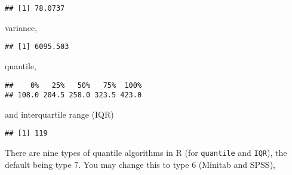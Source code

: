 \documentclass[]{book}
\newenvironment{Shaded}{\begin{snugshade}}{\end{snugshade}}
\newcommand{\KeywordTok}[1]{\textcolor[rgb]{0.13,0.29,0.53}{\textbf{{#1}}}}
\newcommand{\DataTypeTok}[1]{\textcolor[rgb]{0.13,0.29,0.53}{{#1}}}
\newcommand{\DecValTok}[1]{\textcolor[rgb]{0.00,0.00,0.81}{{#1}}}
\newcommand{\NormalTok}[1]{{#1}}
\theoremstyle{definition}
\theoremstyle{definition}
\theoremstyle{remark}
\begin{document}
\begin{Shaded}
\end{Shaded}

\begin{verbatim}
## [1] 78.0737
\end{verbatim}

variance,

\begin{Shaded}
\end{Shaded}

\begin{verbatim}
## [1] 6095.503
\end{verbatim}

quantile,

\begin{Shaded}
\end{Shaded}

\begin{verbatim}
##    0%   25%   50%   75%  100% 
## 108.0 204.5 258.0 323.5 423.0
\end{verbatim}

and interquartile range (IQR)

\begin{Shaded}
\end{Shaded}

\begin{verbatim}
## [1] 119
\end{verbatim}

There are nine types of quantile algorithms in R (for \texttt{quantile}
and \texttt{IQR}), the default being type 7. You may change this to type
6 (Minitab and SPSS),

\begin{Shaded}
\end{Shaded}
\end{document}
